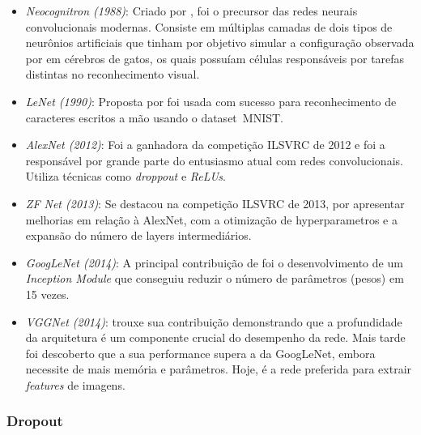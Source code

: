 \begin{itemize}

  \item \emph{Neocognitron (1988)}: Criado por
    \citet{fukushima1988neocognitron}, foi o precursor das redes neurais
    convolucionais modernas. Consiste em múltiplas camadas de dois tipos de
    neurônios artificiais que tinham por objetivo simular a configuração
    observada por \citet{hubel1959receptive} em cérebros de gatos, os quais
    possuíam células responsáveis por tarefas distintas no reconhecimento
    visual.

  \item \emph{LeNet (1990)}: Proposta por \citet{le1990handwritten} foi usada
    com sucesso para reconhecimento de caracteres escritos a mão usando o
    dataset~MNIST.\@

  \item \emph{AlexNet (2012)}: \citet{krizhevsky2012imagenet} Foi a ganhadora
    da competição ILSVRC de 2012 e foi a responsável por grande parte do
    entusiasmo atual com redes convolucionais. Utiliza técnicas como
    \emph{droppout} e \emph{ReLUs}.

  \item \emph{ZF Net (2013)}: Se destacou na competição ILSVRC de 2013, por
    apresentar melhorias em relação à AlexNet, com a otimização de
    hyperparametros e a expansão do número de layers intermediários.
    \citet{zeiler2014visualizing}

  \item \emph{GoogLeNet (2014)}: A principal contribuição de
    \citet{szegedy2014going} foi o desenvolvimento de um \emph{Inception
      Module} que conseguiu reduzir o número de parâmetros (pesos) em 15 vezes.

  \item \emph{VGGNet (2014)}: \citet{zeiler2014visualizing} trouxe sua
    contribuição demonstrando que a profundidade da arquitetura é um componente
    crucial do desempenho da rede. Mais tarde foi descoberto que a sua
    performance supera a da GoogLeNet, embora necessite de mais memória e
    parâmetros. Hoje, é a rede preferida para extrair \emph{features} de
    imagens.

\end{itemize}

\subsubsection{Dropout}

